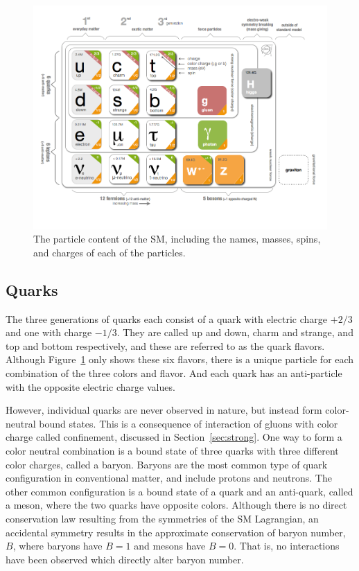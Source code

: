 \begin{figure}[h]
  \centering
  \includegraphics[width=\textwidth]{figures/particle_content.png}
  \caption{The particle content of the \acs*{SM}, including the names, masses, spins, and charges of each of the particles.}
  \label{fig:particle_content}
\end{figure}


\subsection{Quarks}

The three generations of quarks each consist of a quark with electric charge $+2/3$ and one with charge $-1/3$.
They are called up and down, charm and strange, and top and bottom respectively, and these are referred to as the quark flavors.
Although Figure~\ref{fig:particle_content} only shows these six flavors, there is a unique particle for each combination of the three colors and flavor.
And each quark has an anti-particle with the opposite electric charge values.

However, individual quarks are never observed in nature, but instead form color-neutral bound states. 
This is a consequence of interaction of gluons with color charge called confinement, discussed in Section~\ref{sec:strong}.
One way to form a color neutral combination is a bound state of three quarks with three different color charges, called a baryon.
Baryons are the most common type of quark configuration in conventional matter, and include protons and neutrons.
The other common configuration is a bound state of a quark and an anti-quark, called a meson, where the two quarks have opposite colors. 
Although there is no direct conservation law resulting from the symmetries of the \ac{SM} Lagrangian, an accidental symmetry results in the approximate conservation of baryon number, $B$, where baryons have $B=1$ and mesons have $B=0$. That is, no interactions have been observed which directly alter baryon number.

